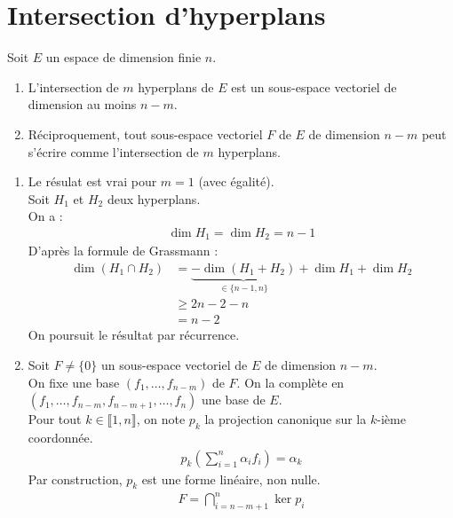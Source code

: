 \documentclass[../main.tex]{subfiles}
\begin{document}
\section{Intersection d'hyperplans}
\begin{tcolorbox}[title=Théorème 22.55, title filled=false, colframe=orange, colback=orange!10!white]
    Soit $E$ un espace de dimension finie $n$. 
    \begin{enumerate}
        \item L'intersection de $m$ hyperplans de $E$ est un sous-espace vectoriel de dimension au moins $n-m$. 
        \item Réciproquement, tout sous-espace vectoriel $F$ de $E$ de dimension $n-m$ peut s'écrire comme l'intersection de $m$ hyperplans. 
    \end{enumerate}
\end{tcolorbox}

\begin{enumerate}
    \item Le résulat est vrai pour $m = 1$ (avec égalité). \\
    Soit $H_1$ et $H_2$ deux hyperplans. \\
    On a : 
    \begin{align*}
        \dim H_1 = \dim H_2 = n-1
    \end{align*}
    D'après la formule de Grassmann : 
    \begin{align*}
        \dim(H_1 \cap H_2) &= \underbrace{-\dim (H_1 + H_2)}_{\in \{n-1, n\}} + \dim H_1 + \dim H_2 \\
        &\geq 2n - 2 - n \\
        &= n-2
    \end{align*}
    On poursuit le résultat par récurrence. 

    \item Soit $F \neq \{0\}$ un sous-espace vectoriel de $E$ de dimension $n-m$. \\
    On fixe une base $(f_1, \ldots, f_{n-m})$ de $F$. On la complète en $(f_1, \ldots, f_{n-m}, f_{n-m+1}, \ldots, f_n)$ une base de $E$. \\
    Pour tout $k\in \llbracket 1, n \rrbracket$, on note $p_k$ la projection canonique sur la $k$-ième coordonnée. 
    \begin{align*}
        p_k \left( \sum_{i=1}^{n} \alpha_i f_i \right) = \alpha_k
    \end{align*}
    Par construction, $p_k$ est une forme linéaire, non nulle. 
    \begin{align*}
        F = \bigcap_{i=n-m+1}^{n} \ker p_i
    \end{align*}
\end{enumerate}
\end{document}
